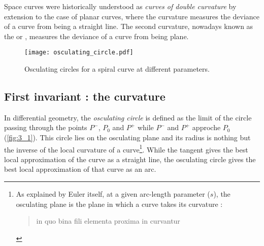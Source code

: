 Space curves were historically understood as \emph{curves of double curvature} by extension to the case of planar curves, where the curvature measures the deviance of a curve from being a straight line. The second curvature, nowadays known as the  or , measures the deviance of a curve from being plane. 


\begin{figure}[t]
	\centering
	\texttt{[image: osculating\_circle.pdf]}
	\caption{Osculating circles for a spiral curve at different parameters.}
	\label{fig:3_2}
\end{figure}

\subsection{First invariant : the curvature}\label{sec:curvature}
In differential geometry, the \emph{osculating circle} is defined as the limit of the circle passing through the points $P^-$, $P_0$ and $P^+$ while $P^-$ and $P^+$ approche $P_0$ (\cref{fig:3_1}). This circle lies on the osculating plane and its radius is nothing but the inverse of the local curvature of a curve\footnote{
As explained by Euler itself, at a given arc-length parameter ($s$), the osculating plane is the plane in which a curve takes its curvature :  
\blockcquote[p.364]{Euler1775}{in quo bina fili elementa proxima in curvantur}.}. While the tangent gives the best local approximation of the curve as a straight line, the osculating circle gives the best local approximation of that curve as an arc.
